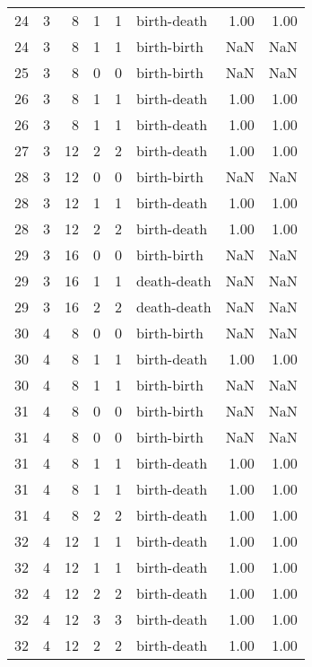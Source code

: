 \documentclass{article}
\begin{document}
\begin{center}
\begin{tabular}{rrrrrlrr}
24 & 3 & 8 & 1 & 1 & birth-death & 1.00 & 1.00 \\
24 & 3 & 8 & 1 & 1 & birth-birth & NaN & NaN \\
25 & 3 & 8 & 0 & 0 & birth-birth & NaN & NaN \\
26 & 3 & 8 & 1 & 1 & birth-death & 1.00 & 1.00 \\
26 & 3 & 8 & 1 & 1 & birth-death & 1.00 & 1.00 \\
27 & 3 & 12 & 2 & 2 & birth-death & 1.00 & 1.00 \\
28 & 3 & 12 & 0 & 0 & birth-birth & NaN & NaN \\
28 & 3 & 12 & 1 & 1 & birth-death & 1.00 & 1.00 \\
28 & 3 & 12 & 2 & 2 & birth-death & 1.00 & 1.00 \\
29 & 3 & 16 & 0 & 0 & birth-birth & NaN & NaN \\
29 & 3 & 16 & 1 & 1 & death-death & NaN & NaN \\
29 & 3 & 16 & 2 & 2 & death-death & NaN & NaN \\
30 & 4 & 8 & 0 & 0 & birth-birth & NaN & NaN \\
30 & 4 & 8 & 1 & 1 & birth-death & 1.00 & 1.00 \\
30 & 4 & 8 & 1 & 1 & birth-birth & NaN & NaN \\
31 & 4 & 8 & 0 & 0 & birth-birth & NaN & NaN \\
31 & 4 & 8 & 0 & 0 & birth-birth & NaN & NaN \\
31 & 4 & 8 & 1 & 1 & birth-death & 1.00 & 1.00 \\
31 & 4 & 8 & 1 & 1 & birth-death & 1.00 & 1.00 \\
31 & 4 & 8 & 2 & 2 & birth-death & 1.00 & 1.00 \\
32 & 4 & 12 & 1 & 1 & birth-death & 1.00 & 1.00 \\
32 & 4 & 12 & 1 & 1 & birth-death & 1.00 & 1.00 \\
32 & 4 & 12 & 2 & 2 & birth-death & 1.00 & 1.00 \\
32 & 4 & 12 & 3 & 3 & birth-death & 1.00 & 1.00 \\
32 & 4 & 12 & 2 & 2 & birth-death & 1.00 & 1.00 \\
\bottomrule
\end{tabular}
\end{center}
\end{document}
